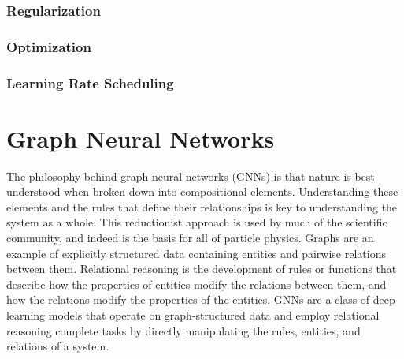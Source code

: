 \subsection{Regularization}

\subsection{Optimization}

\subsection{Learning Rate Scheduling}

\chapter{Graph Neural Networks}


The philosophy behind graph neural networks (GNNs) is that nature is best understood when broken down into compositional elements.
Understanding these elements and the rules that define their relationships is key to understanding the system as a whole.
This reductionist approach is used by much of the scientific community, and indeed is the basis for all of particle physics.
Graphs are an example of explicitly structured data containing entities and pairwise relations between them.
Relational reasoning is the development of rules or functions that describe how the properties of entities modify the relations between them, and how the relations modify the properties of the entities.
GNNs are a class of deep learning models that operate on graph-structured data and employ relational reasoning complete tasks by directly manipulating the rules, entities, and relations of a system.



